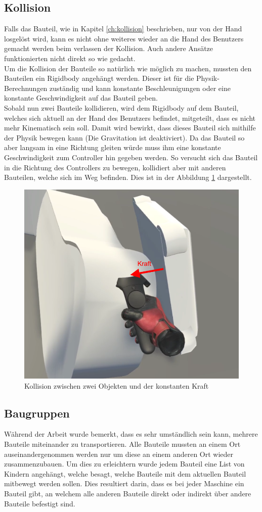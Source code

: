 \subsection{Kollision}
Falls das Bauteil, wie in Kapitel \ref{ch:kollision} beschrieben, nur von der Hand losgelöst wird, kann es nicht ohne weiteres wieder an die Hand des Benutzers gemacht werden beim verlassen der Kollision. Auch andere Ansätze funktionierten nicht direkt so wie gedacht. \\

\noindent Um die Kollision der Bauteile so natürlich wie möglich zu machen, mussten den Bauteilen ein Rigidbody angehängt werden. Dieser ist für die Physik-Berechnungen zuständig und kann konstante Beschleunigungen oder eine konstante Geschwindigkeit auf das Bauteil geben. \\
Sobald nun zwei Bauteile kollidieren, wird dem Rigidbody auf dem Bauteil, welches sich aktuell an der Hand des Benutzers befindet, mitgeteilt, dass es nicht mehr Kinematisch sein soll. Damit wird bewirkt, dass dieses Bauteil sich mithilfe der Physik bewegen kann (Die Gravitation ist deaktiviert). Da das Bauteil so aber langsam in eine Richtung gleiten würde muss ihm eine konstante Geschwindigkeit zum Controller hin gegeben werden. So versucht sich das Bauteil in die Richtung des Controllers zu bewegen, kollidiert aber mit anderen Bauteilen, welche sich im Weg befinden. Dies ist in der Abbildung \ref{fig:collision} dargestellt.

\begin{figure}[h!]
	\centering
	\includegraphics[keepaspectratio,width=0.4\linewidth]{img/Kollision.PNG}
	\caption{Kollision zwischen zwei Objekten und der konstanten Kraft}
	\label{fig:collision}
\end{figure}

\subsection{Baugruppen}
Während der Arbeit wurde bemerkt, dass es sehr umständlich sein kann, mehrere Bauteile miteinander zu transportieren. Alle Bauteile mussten an einem Ort auseinandergenommen werden nur um diese an einem anderen Ort wieder zusammenzubauen. Um dies zu erleichtern wurde jedem Bauteil eine List von Kindern angehängt, welche besagt, welche Bauteile mit dem aktuellen Bauteil mitbewegt werden sollen. Dies resultiert darin, dass es bei jeder Maschine ein Bauteil gibt, an welchem alle anderen Bauteile direkt oder indirekt über andere Bauteile befestigt sind. \\

